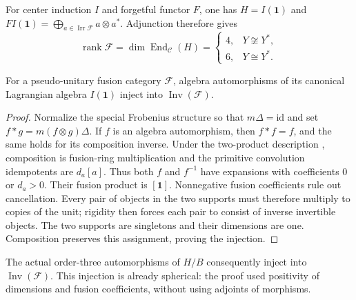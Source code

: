 For center induction $I$ and forgetful functor $F$, one has $H=I(\mathbf1)$
and $FI(\mathbf1)=\bigoplus_{a\in\operatorname{Irr}\mathcal F}a\otimes a^*$.
Adjunction therefore gives
\begin{equation}
 \operatorname{rank}\mathcal F
 =\dim\operatorname{End}_{\mathcal C}(H)
 =\begin{cases}4,&Y\not\cong Y^*,\\6,&Y\cong Y^*.
 \end{cases}
 \label{eq:rank-fork}
\end{equation}
\begin{lemma}
\label{lem:automorphisms-invertibles}
For a pseudo-unitary fusion category $\mathcal F$, algebra
automorphisms of its canonical Lagrangian algebra $I(\mathbf1)$ inject
into $\operatorname{Inv}(\mathcal F)$.
\end{lemma}
\begin{proof}
Normalize the special Frobenius structure so that
$m\Delta=\mathrm{id}$ and set $f*g=m(f\otimes g)\Delta$.
If $f$ is an algebra automorphism, then $f*f=f$, and the same holds
for its composition inverse. Under the two-product description
\cite[Lemma~3.1 and Corollary~3.4]{BJ}, composition is fusion-ring
multiplication and the primitive convolution idempotents are
$d_a[a]$. Thus both $f$ and $f^{-1}$ have expansions with coefficients
$0$ or $d_a>0$. Their fusion product is $[\mathbf1]$.
Nonnegative fusion coefficients rule out cancellation. Every pair of
objects in the two supports must therefore multiply to copies of the
unit; rigidity then forces each pair to consist of inverse invertible
objects. The two supports are singletons and their dimensions are
one. Composition preserves this assignment, proving the injection.
\end{proof}

The actual order-three automorphisms of $H/B$ consequently inject into
$\operatorname{Inv}(\mathcal F)$. This injection is already spherical:
the proof used positivity of dimensions and fusion coefficients,
without using adjoints of morphisms.

